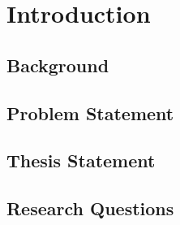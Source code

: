 \chapter{Introduction}\label{chap:intro}

\section{Background}\label{sec:background}

\section{Problem Statement}\label{sec:problem-statement}

\section{Thesis Statement}\label{sec:thesis-statement}

\section{Research Questions}\label{sec:research-questions}

\cite{Scarselli2009}
